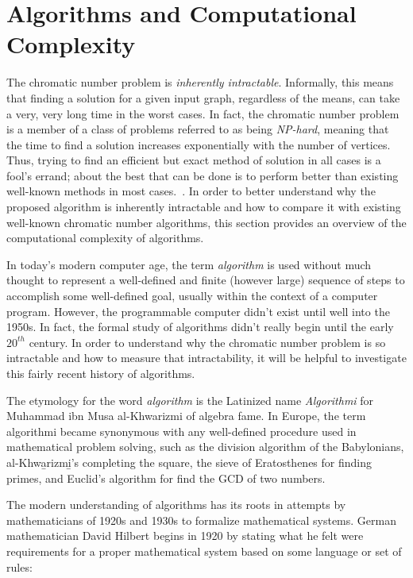 \section{Algorithms and Computational Complexity}

The chromatic number problem is \emph{inherently intractable}.  Informally, this means that finding a solution for
a given input graph, regardless of the means, can take a very, very long time in the worst cases.  In fact, the
chromatic number problem is a member of a class of problems referred to as being \emph{NP-hard}, meaning that the
time to find a solution increases exponentially with the number of vertices.  Thus, trying to find an efficient but
exact method of solution in all cases is a fool's errand; about the best that can be done is to perform better than
existing well-known methods in most cases.~\cite{garey}.  In order to better understand why the proposed algorithm
is inherently intractable and how to compare it with existing well-known chromatic number algorithms, this section
provides an overview of the computational complexity of algorithms.

In today's modern computer age, the term \emph{algorithm} is used without much thought to represent a well-defined
and finite (however large) sequence of steps to accomplish some well-defined goal, usually within the context of a
computer program.  However, the programmable computer didn't exist until well into the 1950s.  In fact, the formal
study of algorithms didn't really begin until the early \(20^{th}\) century.  In order to understand why the
chromatic number problem is so intractable and how to measure that intractability, it will be helpful to
investigate this fairly recent history of algorithms.

The etymology for the word \emph{algorithm} is the Latinized name \emph{Algorithmi} for Muhammad ibn Musa
al-Khwarizmi of algebra fame.  In Europe, the term algorithmi became synonymous with any well-defined procedure
used in mathematical problem solving, such as the division algorithm of the Babylonians, al-Khw\b{a}rizm\b{i}'s
completing the square, the sieve of Eratosthenes for finding primes, and Euclid's algorithm for find the GCD of two
numbers.

The modern understanding of algorithms has its roots in attempts by mathematicians of 1920s and 1930s to formalize
mathematical systems.  German mathematician David Hilbert begins in 1920 by stating what he felt were requirements
for a proper mathematical system based on some language or set of rules:

